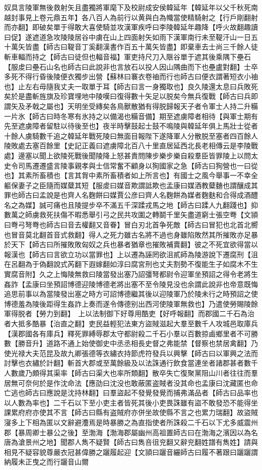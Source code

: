 奴具言陵軍無後救射矢且盡獨將軍麾下及校尉成安侯韓延年【韓延年以父千秋死南越封事見上卷元鼎五年】各八百人為前行以黄與白為幟當使精騎射之【行戶剛翻射而亦翻】即破矣單于得敢大喜使騎並攻漢軍疾呼曰李陵韓延年趣降【呼火故翻趣讀曰促】遂遮道急攻陵陵居谷中虜在山上四面射矢如雨下漢軍南行未至鞮汗山一日五十萬矢皆盡【師古曰鞮音丁奚翻漢書作百五十萬矢皆盡】即棄車去士尚三千餘人徒斬車輻而持之【師古曰徒但也輻音福】軍吏持尺刀入陿谷單于遮其後乘隅下壘石【服䖍曰壘石山名也師古曰此說非也言放石以投人因山隅曲而下也壘盧對翻】士卒多死不得行昏後陵便衣獨步出營【蘇林曰褰衣卷䄂而行也師古曰便衣謂著短衣小䄂也】止左右毋隨我丈夫一取單于耳【師古曰言一身獨取也】良久陵還太息曰兵敗死矣於是盡斬旌旗及珍寶埋地中陵嘆曰復得數十矢足以脱矣今無兵復戰【師古曰兵即謂矢及矛戟之屬也】天明坐受縳矣各鳥獸散猶有得脱歸報天子者令軍士人持二升糒一片氷【師古曰時冬寒有氷持之以備渴也糒音備】期至遮虜障者相待【與軍士期有先至遮虜障者留駐以待後至也】夜半時擊鼓起士鼓不鳴陵與韓延年俱上馬壯士從者十餘人虜騎數千追之韓延年戰死陵曰無面目報陛下遂降軍人分散脱至塞者四百餘人陵敗處去塞百餘里【史記正義曰遮虜障北百八十里直居延西北長老相傳云是李陵戰處】邊塞以聞上欲陵死戰後聞陵降上怒甚責問陳步樂步樂自殺羣臣皆罪陵上以問太史令司馬遷遷盛言陵事親孝與士信常奮不顧身以狥國家之急【師古曰狥營也一曰從也】其素所畜積也【言其胷中素所畜積者如上所言也】有國士之風今舉事一不幸全軀保妻子之臣隨而媒糵其短【服䖍曰媒音欺謂詆欺也孟康曰媒酒教糵麯也謂釀成其罪也師古曰孟說是也齊人名麴餅曰媒賈公彦曰齊人名麴餅為媒者麴麩和合得成酒醴名之為媒】誠可痛也且陵提步卒不滿五千深蹂戎馬之地【師古曰蹂人九翻踐也】抑數萬之師虜救死扶傷不暇悉舉引弓之民共攻圍之轉鬬千里矢盡道窮士張空弮【文頴曰弮弓弩弮也師古曰音去權翻又音眷】冒白刃北首争死敵【師古曰冒犯也北首北嚮也冒音莫北翻首音式救翻】得人之死力雖古名將不過也身雖陷敗然其所摧敗亦足暴於天下【師古曰所摧敗敗匈奴之兵也暴者猶章也摧敗補賣翻】彼之不死宜欲得當以報漢也【師古曰言欲立功以當罪也】上以遷為誣罔欲沮貳師為陵游說下遷腐刑【沮在呂翻為于偽翻說式芮翻下遐嫁翻如淳曰腐宮刑也丈夫割勢不復能生子如腐木不生實腐音附】久之上悔陵無救曰陵當發出塞乃詔彊弩都尉令迎軍坐預詔之得令老將生姦詐【孟康曰坐預詔博德迎陵博德老將出塞不至令陵見没也余謂此說非也帝意既悔追思前事以為當陵發出塞之時方可詔博德繼其後以迎陵軍乃於陵未行之時預詔之使博德羞為陵後距得生姦詐上奏而遂令傳德别出西河使陵軍無救也】乃遣使勞賜陵餘軍得脱者【勞力到翻】　上以法制御下好尊用酷吏【好呼報翻】而郡國二千石為治者大抵多酷暴【治直之翻】吏民益輕犯法東方盜賊滋起大羣至數千人攻城邑取庫兵【漢郡國各有庫兵】釋死罪縛辱郡太守都尉殺二千石小羣以百數掠鹵鄉里者不可勝數【勝音升】道路不通上始使御史中丞丞相長史督之弗能禁【督察也禁居禽翻】乃使光禄大夫范昆及故九卿張德等衣繡衣持節虎符發兵以興擊【師古曰以軍興之法而討擊也衣繡於計翻】斬首大郡或至萬餘級及以法誅通行飲食當連坐者諸郡甚者數千人數歲乃頗得其渠率【師古曰渠大也率所類翻】散卒失亡復聚黨阻山川者往往而羣居無可奈何於是作沈命法【應劭曰沈没也敢蔽匿盗賊者没其命也孟康曰沈藏匿也命亡逃也師古曰應說是沈持林翻】曰羣盜起不發覺發覺而捕弗滿品者【師古曰品率也以人數為率也】二千石以下至小吏主者皆死其後小吏畏誅雖有盜不敢發恐不能得坐課累府府亦使其不言【師古曰縣有盗賊府亦併坐故使縣不言之也累力瑞翻】故盜賊寖多上下相為匿以文辭避灋焉是時暴勝之為直指使者所誅殺二千石以下尤多威震州郡【暴周卿士暴公之後】至渤海【渤海郡屬幽州高祖置師古曰在渤海之濱因以為名唐為滄景州之地】聞郡人雋不疑賢【師古曰雋咅徂兖翻又辭兖翻姓譜有雋姓】請與相見不疑容貌尊嚴衣冠甚偉勝之躧履起迎【文頴曰躧音纚師古曰履不著跟曰躧躧謂納履未正曳之而行躧音山爾